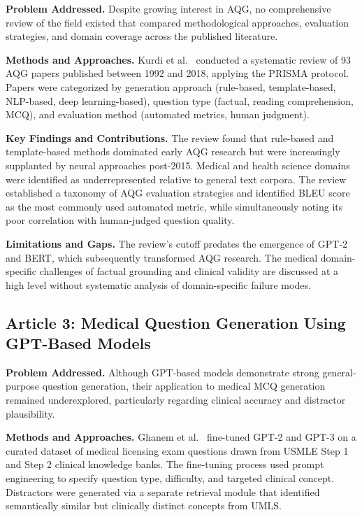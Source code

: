 \documentclass[conference]{IEEEtran}
\begin{document}
\textbf{Problem Addressed.} Despite growing interest in AQG, no comprehensive review of the field existed that compared methodological approaches, evaluation strategies, and domain coverage across the published literature.

\textbf{Methods and Approaches.} Kurdi et al.~\cite{kurdi2020systematic} conducted a systematic review of 93 AQG papers published between 1992 and 2018, applying the PRISMA protocol. Papers were categorized by generation approach (rule-based, template-based, NLP-based, deep learning-based), question type (factual, reading comprehension, MCQ), and evaluation method (automated metrics, human judgment).

\textbf{Key Findings and Contributions.} The review found that rule-based and template-based methods dominated early AQG research but were increasingly supplanted by neural approaches post-2015. Medical and health science domains were identified as underrepresented relative to general text corpora. The review established a taxonomy of AQG evaluation strategies and identified BLEU score as the most commonly used automated metric, while simultaneously noting its poor correlation with human-judged question quality.

\textbf{Limitations and Gaps.} The review's cutoff predates the emergence of GPT-2 and BERT, which subsequently transformed AQG research. The medical domain-specific challenges of factual grounding and clinical validity are discussed at a high level without systematic analysis of domain-specific failure modes.

\subsection{Article 3: Medical Question Generation Using GPT-Based Models~\cite{ghanem2022medical}}

\textbf{Problem Addressed.} Although GPT-based models demonstrate strong general-purpose question generation, their application to medical MCQ generation remained underexplored, particularly regarding clinical accuracy and distractor plausibility.

\textbf{Methods and Approaches.} Ghanem et al.~\cite{ghanem2022medical} fine-tuned GPT-2 and GPT-3 on a curated dataset of medical licensing exam questions drawn from USMLE Step 1 and Step 2 clinical knowledge banks. The fine-tuning process used prompt engineering to specify question type, difficulty, and targeted clinical concept. Distractors were generated via a separate retrieval module that identified semantically similar but clinically distinct concepts from UMLS.
\end{document}
